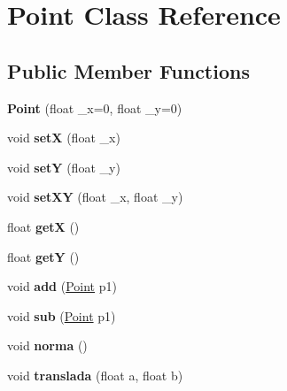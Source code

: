 \hypertarget{classPoint}{}\section{Point Class Reference}
\label{classPoint}
\subsection*{Public Member Functions}
\begin{DoxyCompactItemize}
\item 
\mbox{\label{classPoint_a06c32166c2ad9eac25799ef189b49683}} 
{\bfseries Point} (float \+\_\+x=0, float \+\_\+y=0)
\item 
\mbox{\label{classPoint_a428a1676e2fdec6753c42011a1d59d18}} 
void {\bfseries setX} (float \+\_\+x)
\item 
\mbox{\label{classPoint_a9868c4601b0ea0c2d0de20fe41ee0e49}} 
void {\bfseries setY} (float \+\_\+y)
\item 
\mbox{\label{classPoint_ab5385c6d9bfa841e641e4709fc9f14cc}} 
void {\bfseries set\+XY} (float \+\_\+x, float \+\_\+y)
\item 
\mbox{\label{classPoint_acc27466778cc87a662bba40268c4c0c8}} 
float {\bfseries getX} ()
\item 
\mbox{\label{classPoint_a3cccbca94719ddde353cce86ce0e2f64}} 
float {\bfseries getY} ()
\item 
\mbox{\label{classPoint_a6bcf8fd2524ecc4d5b6c1dc942d541a5}} 
void {\bfseries add} (\hyperlink{classPoint}{Point} p1)
\item 
\mbox{\label{classPoint_af7d9e533f0030edf4ab28fdc0f12acd4}} 
void {\bfseries sub} (\hyperlink{classPoint}{Point} p1)
\item 
\mbox{\label{classPoint_a6233714649b03294a020827fb53eb8ad}} 
void {\bfseries norma} ()
\item 
\mbox{\label{classPoint_ad9676e36f3444534b609e3c68422239a}} 
void {\bfseries translada} (float a, float b)

\end{DoxyCompactItemize}
